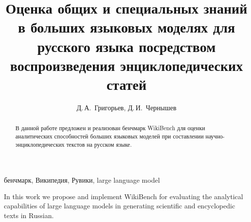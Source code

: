 \documentclass{article}
\theoremstyle{definition}
\theoremstyle{plain}
\begin{document}
\raggedbottom
{}


\title{Оценка общих и специальных знаний в больших языковых моделях для русского языка посредством воспроизведения энциклопедических статей}

\author{Д.\,А.~Григорьев\Addressmark[1]\Emailmark[1], Д.\,И.~Чернышев\Addressmark[1]\Emailmark[2]}











\maketitle


\begin{abstract}
В данной работе предложен и реализован бенчмарк WikiBench для оценки аналитических способностей больших языковых моделей при составлении научно-энциклопедических текстов на русском языке. 
\end{abstract}

\begin{keywords}
бенчмарк, Википедия, Рувики, large language model
\end{keywords}

\begin{altabstract}
In this work we propose and implement WikiBench for evaluating the analytical capabilities of large language models in generating scientific and encyclopedic texts in Russian.
\end{altabstract}
\end{document}
